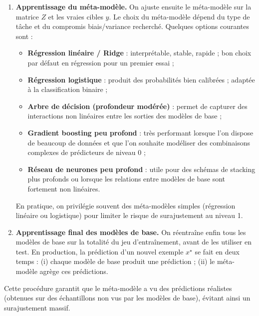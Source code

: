 \begin{enumerate}
  \item \textbf{Apprentissage du méta-modèle.} On ajuste ensuite le méta-modèle sur la matrice
  $Z$ et les vraies cibles $y$. Le choix du méta-modèle dépend du type de tâche et du
  compromis biais/variance recherché. Quelques options courantes sont :
  \begin{itemize}
    \item \textbf{Régression linéaire / Ridge} : interprétable, stable, rapide ; bon choix par défaut
    en régression pour un premier essai ;
    \item \textbf{Régression logistique} : produit des probabilités bien calibrées ; adaptée à la
    classification binaire ;
    \item \textbf{Arbre de décision (profondeur modérée)} : permet de capturer des interactions
    non linéaires entre les sorties des modèles de base ;
    \item \textbf{Gradient boosting peu profond} : très performant lorsque l'on dispose de beaucoup
    de données et que l'on souhaite modéliser des combinaisons complexes de prédicteurs de
    niveau 0 ;
    \item \textbf{Réseau de neurones peu profond} : utile pour des schémas de stacking plus
    profonds ou lorsque les relations entre modèles de base sont fortement non linéaires.
  \end{itemize}
  En pratique, on privilégie souvent des méta-modèles simples (régression linéaire ou logistique)
  pour limiter le risque de surajustement au niveau 1.

  \item \textbf{Apprentissage final des modèles de base.} On réentraîne enfin tous les modèles de
  base sur la totalité du jeu d'entraînement, avant de les utiliser en test. En production, la
  prédiction d'un nouvel exemple $x^\star$ se fait en deux temps : (i) chaque modèle de base
  produit une prédiction ; (ii) le méta-modèle agrège ces prédictions.
\end{enumerate}

Cette procédure garantit que le méta-modèle a vu des prédictions réalistes (obtenues sur des
échantillons non vus par les modèles de base), évitant ainsi un surajustement massif.

